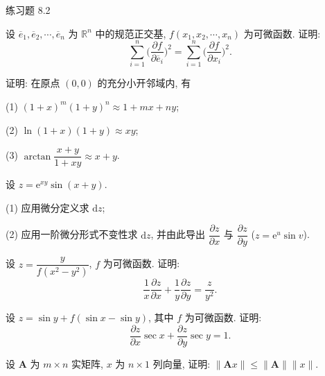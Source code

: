 \begin{exblock}{练习题 8.2}
  \item 设 $\overline{e}_{1}, \overline{e}_{2}, \cdots, \overline{e}_{n}$ 为 $\mathbb{R}^{n}$ 中的规范正交基, $f(x_{1}, x_{2}, \cdots, x_{n})$ 为可微函数. 证明:
  \[
    \sum_{i=1}^{n}\Big(\frac{\partial f}{\partial\overline{e}_{i}}\Big)^{2} = \sum_{i=1}^{n}\Big(\frac{\partial f}{\partial x_{i}}\Big)^{2}.
  \]

  \item 证明: 在原点 $(0, 0)$ 的充分小开邻域内, 有

  (1) $(1 + x)^{m}(1 + y)^{n} \approx 1 + mx + ny$;

  (2) $\ln(1 + x)(1 + y) \approx xy$;

  (3) $\arctan\dfrac{x + y}{1 + xy} \approx x + y$.

  \item 设 $z = \mathrm{e}^{xy}\sin(x + y)$.

  (1) 应用微分定义求 $\mathrm{d}z$;

  (2) 应用一阶微分形式不变性求 $\mathrm{d}z$, 并由此导出 $\dfrac{\partial z}{\partial x}$ 与 $\dfrac{\partial z}{\partial y}$ ($z = \mathrm{e}^{u}\sin v$).

  \item 设 $z = \dfrac{y}{f(x^{2} - y^{2})}$, $f$ 为可微函数. 证明:
  \[
    \frac{1}{x}\frac{\partial z}{\partial x} + \frac{1}{y}\frac{\partial z}{\partial y} = \frac{z}{y^{2}}.
  \]

  \item 设 $z = \sin y + f(\sin x - \sin y)$, 其中 $f$ 为可微函数. 证明:
  \[
    \frac{\partial z}{\partial x}\sec x + \frac{\partial z}{\partial y}\sec y = 1.
  \]

  \item 设 $\boldsymbol{A}$ 为 $m \times n$ 实矩阵, $x$ 为 $n \times 1$ 列向量, 证明: $\|\boldsymbol{A}x\| \leqslant \|\boldsymbol{A}\|\|x\|$.
\end{exblock}

